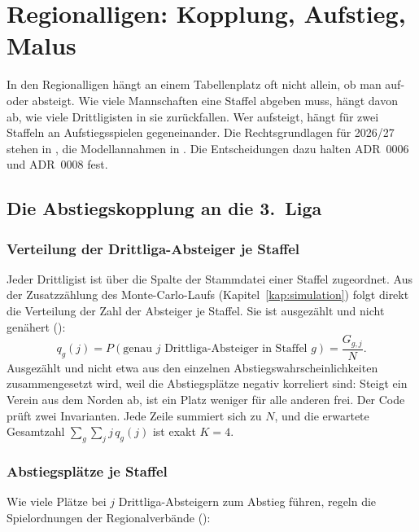 \chapter{Regionalligen: Kopplung, Aufstieg, Malus}\label{kap:regionalliga}

In den Regionalligen hängt an einem Tabellenplatz oft nicht allein, ob man
auf- oder absteigt. Wie viele Mannschaften eine Staffel abgeben muss, hängt
davon ab, wie viele Drittligisten in sie zurückfallen. Wer aufsteigt, hängt
für zwei Staffeln an Aufstiegsspielen gegeneinander. Die Rechtsgrundlagen
für 2026/27 stehen in , die
Modellannahmen in . Die
Entscheidungen dazu halten ADR~0006 und ADR~0008 fest.

\section{Die Abstiegskopplung an die 3.~Liga}\label{sec:kopplung}

\subsection*{Verteilung der Drittliga-Absteiger je Staffel}

Jeder Drittligist ist über die Spalte  der Stammdatei einer
Staffel zugeordnet. Aus der Zusatzzählung des Monte-Carlo-Laufs
(Kapitel~\ref{kap:simulation}) folgt direkt die Verteilung der Zahl der
Absteiger je Staffel. Sie ist ausgezählt und nicht genähert
():
\begin{equation}
  q_g(j) = P(\text{genau } j \text{ Drittliga-Absteiger in Staffel } g) = \frac{G_{g,j}}{N}.
\end{equation}
Ausgezählt und nicht etwa aus den einzelnen Abstiegswahrscheinlichkeiten
zusammengesetzt wird, weil die Abstiegsplätze negativ korreliert sind:
Steigt ein Verein aus dem Norden ab, ist ein Platz weniger für alle anderen
frei. Der Code prüft zwei Invarianten. Jede Zeile summiert sich zu $N$, und
die erwartete Gesamtzahl $\sum_g \sum_j j\,q_g(j)$ ist exakt $K = 4$.

\subsection*{Abstiegsplätze je Staffel}

Wie viele Plätze bei $j$ Drittliga-Absteigern zum Abstieg führen, regeln die
Spielordnungen der Regionalverbände ():

